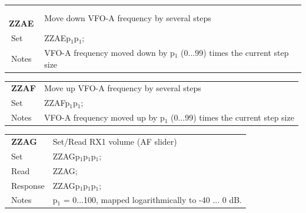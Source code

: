 \documentclass[12pt]{book}
\begin{document}
\begin{center}
\begin{tabular}{|p{2cm}|p{11cm}|}
\toprule
$\phantom{\Big|}$\textbf{\large ZZAE} & Move down VFO-A frequency by several steps \\\cline{1-2}
$\phantom{\Big|}${\large Set} & {ZZAEp$_1$p$_1$;} \\\hline
$\phantom{\Big|}${\large Notes} & \multicolumn{1}{|p{11cm}|}{VFO-A frequency moved down by p$_1$ (0...99) times the current step size} \\
\bottomrule
\end{tabular}
\end{center}

\begin{center}
\begin{tabular}{|p{2cm}|p{11cm}|}
\toprule
$\phantom{\Big|}$\textbf{\large ZZAF} & Move up VFO-A frequency by several steps \\\cline{1-2}
$\phantom{\Big|}${\large Set} & {ZZAFp$_1$p$_1$;} \\\hline
$\phantom{\Big|}${\large Notes} & \multicolumn{1}{|p{11cm}|}{VFO-A frequency moved up by p$_1$ (0...99) times the current step size} \\
\bottomrule
\end{tabular}
\end{center}

\begin{center}
\begin{tabular}{|p{2cm}|p{11cm}|}
\toprule
$\phantom{\Big|}$\textbf{\large ZZAG} & Set/Read RX1 volume (AF slider) \\\cline{1-2}
$\phantom{\Big|}${\large Set} & {ZZAGp$_1$p$_1$p$_1$;} \\\hline
$\phantom{\Big|}${\large Read} & {ZZAG;} \\\hline
$\phantom{\Big|}${\large Response} & {ZZAGp$_1$p$_1$p$_1$;} \\\hline
$\phantom{\Big|}${\large Notes} & \multicolumn{1}{|p{11cm}|}{p$_1$ = 0...100, mapped logarithmically to -40 ... 0 dB.} \\
\bottomrule
\end{tabular}
\end{center}
\end{document}
